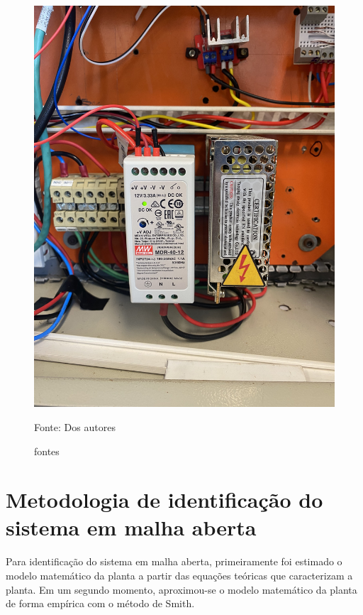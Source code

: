 \begin{figure}[H]
    \centering\footnotesize
    \caption{fontes}
    \begin{center}
        \includegraphics[scale=0.1]{imagens/fontes.jpg}
    \end{center}
    \label{fig:fonte}
    \par Fonte: Dos autores
\end{figure}

\section{Metodologia de identificação do sistema em malha aberta}
\hspace{11mm} Para identificação do sistema em malha aberta, primeiramente foi estimado o modelo matemático da planta a partir das equações teóricas que caracterizam a planta. Em um segundo momento, aproximou-se o modelo matemático da planta de forma empírica com o método de Smith.


